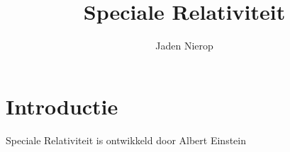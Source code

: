 \documentclass[12pt,a4paper]{report}
\title{Speciale Relativiteit}
\author{Jaden Nierop}
\begin{document}
\maketitle

\tableofcontents


\chapter*{Introductie} 
Speciale Relativiteit is ontwikkeld door Albert Einstein 
\end{document}

